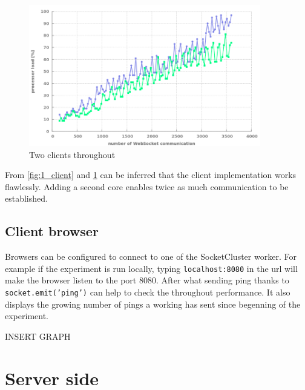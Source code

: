 \begin{figure}[H]
	\centering
		\includegraphics[width=0.9\textwidth]{./Figures/2_client.png}
	\caption[2_client]{Two clients throughout}
	\label{fig:2_client}
\end{figure}

From \ref{fig:1_client} and  \ref{fig:2_client} can be inferred that the client implementation works flawlessly. Adding a second core enables twice as much communication  to be established.

\subsection{Client browser}

Browsers can be configured to connect to one of the SocketCluster worker. For example if the experiment is run locally, typing \texttt{localhost:8080} in the url will make the browser listen to the port 8080. After what sending ping thanks to \texttt{socket.emit('ping')} can help to check the throughout performance. It also displays the growing number of pings a working has sent since begenning of the experiment.

INSERT GRAPH

\section{Server side}
